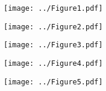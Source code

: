 \documentclass[a4paper,12pt]{article}
\begin{document}
\pagestyle{empty}

\renewcommand{\figurename}{Laverr\'e \textit{et al.}, Figure}


\addtolength{\oddsidemargin}{-.875in}
\addtolength{\evensidemargin}{-.875in}

\addtolength{\textwidth}{1.75in}



\begin{figure}[!htb]
  \caption{\label{fig:1} }
  \texttt{[image: ../Figure1.pdf]}
\end{figure}


\newpage
\clearpage
\begin{figure}[!htb]
  \caption{\label{fig:2} }
  \texttt{[image: ../Figure2.pdf]}
\end{figure}

\newpage
\clearpage

\begin{figure}[!htb]
  \caption{\label{fig:3} }
  \texttt{[image: ../Figure3.pdf]}
\end{figure}


\newpage
\clearpage

\begin{figure}[!htb]
  \caption{\label{fig:4} }
  \texttt{[image: ../Figure4.pdf]}
\end{figure}

\newpage
\clearpage


\begin{figure}[!htb]
  \caption{\label{fig:5} }
  \texttt{[image: ../Figure5.pdf]}
\end{figure}


\newpage
\clearpage


 
\end{document}
